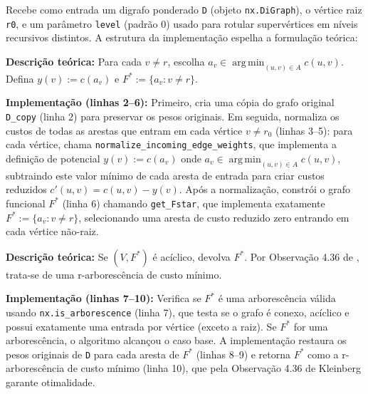 Recebe como entrada um digrafo ponderado \texttt{D} (objeto \texttt{nx.DiGraph}), o vértice raiz \texttt{r0}, e um parâmetro \texttt{level} (padrão 0) usado para rotular supervértices em níveis recursivos distintos. A estrutura da implementação espelha a formulação teórica:

\begin{tcolorbox}[
        enhanced, breakable,
        colframe=green!60!black, colback=green!5,
        colbacktitle=green!20, coltitle=black,
        title={Passo 1: Normalização e construção de $F^*$},
        boxed title style={sharp corners, boxrule=0.6pt},
        sharp corners, boxrule=0.6pt
    ]
    \textbf{Descrição teórica:} Para cada \(v\neq r\), escolha \(a_v\in\mathop{\mathrm{arg\,min}}_{(u,v)\in A} c(u,v)\). Defina \(y(v):=c(a_v)\) e \(F^*:=\{a_v : v\neq r\}\).

    \tcblower

    \textbf{Implementação (linhas 2--6):} Primeiro, cria uma cópia do grafo original \texttt{D\_copy} (linha 2) para preservar os pesos originais. Em seguida, normaliza os custos de todas as arestas que entram em cada vértice \(v \neq r_0\) (linhas 3--5): para cada vértice, chama \texttt{normalize\_incoming\_edge\_weights}, que implementa a definição de potencial \(y(v):=c(a_v)\) onde \(a_v\in\mathop{\mathrm{arg\,min}}_{(u,v)\in A} c(u,v)\), subtraindo este valor mínimo de cada aresta de entrada para criar custos reduzidos \(c'(u,v)=c(u,v)-y(v)\). Após a normalização, constrói o grafo funcional \(F^*\) (linha 6) chamando \texttt{get\_Fstar}, que implementa exatamente \(F^*:=\{a_v : v\neq r\}\), selecionando uma aresta de custo reduzido zero entrando em cada vértice não-raiz.
\end{tcolorbox}

\begin{tcolorbox}[
        enhanced, breakable,
        colframe=green!60!black, colback=green!5,
        colbacktitle=green!20, coltitle=black,
        title={Passo 2: Verificação de aciclicidade},
        boxed title style={sharp corners, boxrule=0.6pt},
        sharp corners, boxrule=0.6pt
    ]
    \textbf{Descrição teórica:} Se \((V,F^*)\) é acíclico, devolva \(F^*\). Por Observação 4.36 de \cite{kleinberg2006}, trata-se de uma r-arborescência de custo mínimo.

    \tcblower

    \textbf{Implementação (linhas 7--10):} Verifica se \(F^*\) é uma arborescência válida usando \texttt{nx.is\_arborescence} (linha 7), que testa se o grafo é conexo, acíclico e possui exatamente uma entrada por vértice (exceto a raiz). Se \(F^*\) for uma arborescência, o algoritmo alcançou o caso base. A implementação restaura os pesos originais de \texttt{D} para cada aresta de \(F^*\) (linhas 8--9) e retorna \(F^*\) como a r-arborescência de custo mínimo (linha 10), que pela Observação 4.36 de Kleinberg garante otimalidade.
\end{tcolorbox}

